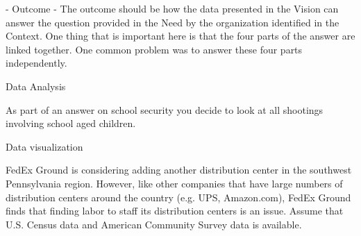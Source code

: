 \documentclass[12pt, letter, addpoints]{exam}
\begin{document}
\begin{questions}
\begin{solution}[3in]
-  Outcome - The outcome should be how the data presented in the Vision can answer the question provided in the Need by the organization identified in the Context.  One thing that is important here is that the four parts of the answer are linked together.  One common problem was to answer these four parts independently.
\end{solution}
\pagebreak
\question[35] Data Analysis

As part of an answer on school security you decide to look at all shootings involving school aged children.

\pagebreak

\begin{center}
\gradetable[v][questions]
\end{center}
\question[30] Data visualization

FedEx Ground is considering adding another distribution center in the southwest Pennsylvania region.  However, like other companies that have large numbers of distribution centers around the country (e.g. UPS, Amazon.com), FedEx Ground finds that finding labor to staff its distribution centers is an issue.  Assume that U.S. Census data and American Community Survey data is available.


\end{questions}
\end{document}
